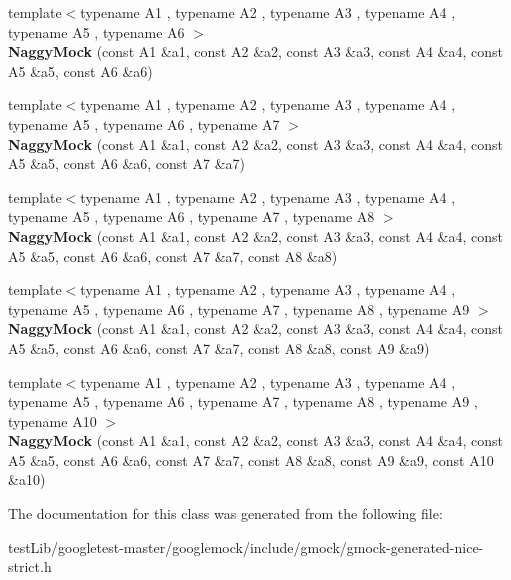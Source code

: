 \begin{DoxyCompactItemize}
\item 
\mbox{\label{classtesting_1_1NaggyMock_aac4c0986e917a5d6e515f8dc0e7bf644}} 
{\footnotesize template$<$typename A1 , typename A2 , typename A3 , typename A4 , typename A5 , typename A6 $>$ }\\{\bfseries Naggy\+Mock} (const A1 \&a1, const A2 \&a2, const A3 \&a3, const A4 \&a4, const A5 \&a5, const A6 \&a6)
\item 
\mbox{\label{classtesting_1_1NaggyMock_ad1edac1991dd20514e822c90d6896c74}} 
{\footnotesize template$<$typename A1 , typename A2 , typename A3 , typename A4 , typename A5 , typename A6 , typename A7 $>$ }\\{\bfseries Naggy\+Mock} (const A1 \&a1, const A2 \&a2, const A3 \&a3, const A4 \&a4, const A5 \&a5, const A6 \&a6, const A7 \&a7)
\item 
\mbox{\label{classtesting_1_1NaggyMock_a63b30506f56b792ffbdc5792a9630d5e}} 
{\footnotesize template$<$typename A1 , typename A2 , typename A3 , typename A4 , typename A5 , typename A6 , typename A7 , typename A8 $>$ }\\{\bfseries Naggy\+Mock} (const A1 \&a1, const A2 \&a2, const A3 \&a3, const A4 \&a4, const A5 \&a5, const A6 \&a6, const A7 \&a7, const A8 \&a8)
\item 
\mbox{\label{classtesting_1_1NaggyMock_a786f31ade7b8b9f6e78e07f51cc0e14b}} 
{\footnotesize template$<$typename A1 , typename A2 , typename A3 , typename A4 , typename A5 , typename A6 , typename A7 , typename A8 , typename A9 $>$ }\\{\bfseries Naggy\+Mock} (const A1 \&a1, const A2 \&a2, const A3 \&a3, const A4 \&a4, const A5 \&a5, const A6 \&a6, const A7 \&a7, const A8 \&a8, const A9 \&a9)
\item 
\mbox{\label{classtesting_1_1NaggyMock_aa40a39806b939f423696f9380de3172b}} 
{\footnotesize template$<$typename A1 , typename A2 , typename A3 , typename A4 , typename A5 , typename A6 , typename A7 , typename A8 , typename A9 , typename A10 $>$ }\\{\bfseries Naggy\+Mock} (const A1 \&a1, const A2 \&a2, const A3 \&a3, const A4 \&a4, const A5 \&a5, const A6 \&a6, const A7 \&a7, const A8 \&a8, const A9 \&a9, const A10 \&a10)
\end{DoxyCompactItemize}


The documentation for this class was generated from the following file\+:\begin{DoxyCompactItemize}
\item 
test\+Lib/googletest-\/master/googlemock/include/gmock/gmock-\/generated-\/nice-\/strict.\+h\end{DoxyCompactItemize}

